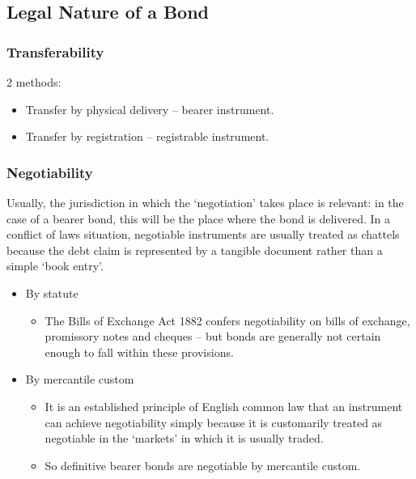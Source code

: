 \documentclass[
]{article}
\providecommand{\tightlist}{%
  \setlength{\itemsep}{0pt}\setlength{\parskip}{0pt}}
\begin{document}
\hypertarget{legal-nature-of-a-bond}{%
\subsection{Legal Nature of a Bond}\label{legal-nature-of-a-bond}}

\hypertarget{transferability}{%
\subsubsection{Transferability}\label{transferability}}

2 methods:

\begin{itemize}
\tightlist
\item
  Transfer by physical delivery -- bearer instrument.
\item
  Transfer by registration -- registrable instrument.
\end{itemize}

\hypertarget{negotiability}{%
\subsubsection{Negotiability}\label{negotiability}}

Usually, the jurisdiction in which the `negotiation' takes place is
relevant: in the case of a bearer bond, this will be the place where the
bond is delivered. In a conflict of laws situation, negotiable
instruments are usually treated as chattels because the debt claim is
represented by a tangible document rather than a simple `book entry'.

\begin{itemize}
\tightlist
\item
  By statute

  \begin{itemize}
  \tightlist
  \item
    The Bills of Exchange Act 1882 confers negotiability on bills of
    exchange, promissory notes and cheques -- but bonds are generally
    not certain enough to fall within these provisions.
  \end{itemize}
\item
  By mercantile custom

  \begin{itemize}
  \tightlist
  \item
    It is an established principle of English common law that an
    instrument can achieve negotiability simply because it is
    customarily treated as negotiable in the `markets' in which it is
    usually traded.
  \item
    So definitive bearer bonds are negotiable by mercantile custom.
  \end{itemize}
\end{itemize}
\end{document}
